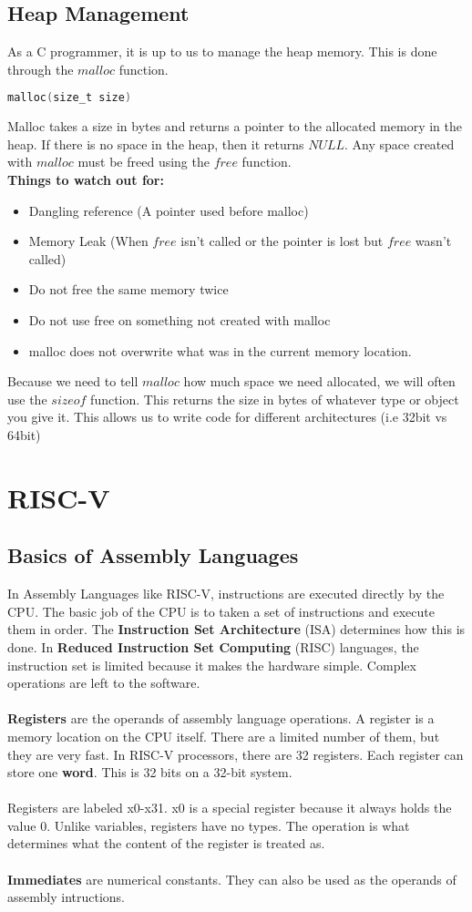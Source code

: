 \documentclass{article}
\begin{document}
\subsection{Heap Management}
As a C programmer, it is up to us to manage the heap memory. This is done through the $malloc$ function.
\begin{lstlisting}[language=C]
    malloc(size_t size)
\end{lstlisting}
Malloc takes a size in bytes and returns a pointer to the allocated memory in the heap. If there is no space in the heap, then it returns $NULL$.
Any space created with $malloc$ must be freed using the $free$ function.\\
\textbf{Things to watch out for: }
\begin{itemize}
    \item Dangling reference (A pointer used before malloc)
    \item Memory Leak (When $free$ isn't called or the pointer is lost but $free$ wasn't called)
    \item Do not free the same memory twice
    \item Do not use free on something not created with malloc
    \item malloc does not overwrite what was in the current memory location.
\end{itemize}
Because we need to tell $malloc$ how much space we need allocated, we will often use the $sizeof$ function.
This returns the size in bytes of whatever type or object you give it. This allows us to write code for different architectures (i.e 32bit vs 64bit)
\section{RISC-V}
\subsection{Basics of Assembly Languages}
In Assembly Languages like RISC-V, instructions are executed directly by the CPU. The basic job of the CPU is to taken
a set of instructions and execute them in order. The \textbf{Instruction Set Architecture} (ISA) determines how this is done.
In \textbf{Reduced Instruction Set Computing} (RISC) languages, the instruction set is limited because it makes the hardware simple.
Complex operations are left to the software.\\\\
\textbf{Registers} are the operands of assembly language operations. A register is a memory location on the CPU itself. There are a limited
number of them, but they are very fast. In RISC-V processors, there are 32 registers. Each register can store one \textbf{word}.
This is 32 bits on a 32-bit system.\\\\
Registers are labeled x0-x31. x0 is a special register because it always holds the value 0. Unlike variables, registers have no types. The operation
is what determines what the content of the register is treated as.\\\\
\textbf{Immediates} are numerical constants. They can also be used as the operands of assembly intructions.
\end{document}
